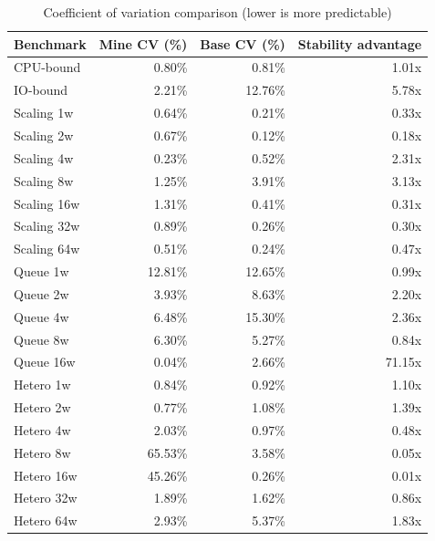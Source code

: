 \begin{table}[htbp]
\centering
\caption{Coefficient of variation comparison (lower is more predictable)}
\label{tab:variance}
\begin{tabular}{lrrr}
\toprule
Benchmark & Mine CV (\%) & Base CV (\%) & Stability advantage \\
\midrule
CPU-bound & 0.80\% & 0.81\% & 1.01x \\
IO-bound & 2.21\% & 12.76\% & 5.78x \\
Scaling 1w & 0.64\% & 0.21\% & 0.33x \\
Scaling 2w & 0.67\% & 0.12\% & 0.18x \\
Scaling 4w & 0.23\% & 0.52\% & 2.31x \\
Scaling 8w & 1.25\% & 3.91\% & 3.13x \\
Scaling 16w & 1.31\% & 0.41\% & 0.31x \\
Scaling 32w & 0.89\% & 0.26\% & 0.30x \\
Scaling 64w & 0.51\% & 0.24\% & 0.47x \\
Queue 1w & 12.81\% & 12.65\% & 0.99x \\
Queue 2w & 3.93\% & 8.63\% & 2.20x \\
Queue 4w & 6.48\% & 15.30\% & 2.36x \\
Queue 8w & 6.30\% & 5.27\% & 0.84x \\
Queue 16w & 0.04\% & 2.66\% & 71.15x \\
Hetero 1w & 0.84\% & 0.92\% & 1.10x \\
Hetero 2w & 0.77\% & 1.08\% & 1.39x \\
Hetero 4w & 2.03\% & 0.97\% & 0.48x \\
Hetero 8w & 65.53\% & 3.58\% & 0.05x \\
Hetero 16w & 45.26\% & 0.26\% & 0.01x \\
Hetero 32w & 1.89\% & 1.62\% & 0.86x \\
Hetero 64w & 2.93\% & 5.37\% & 1.83x \\
\bottomrule
\end{tabular}
\end{table}

